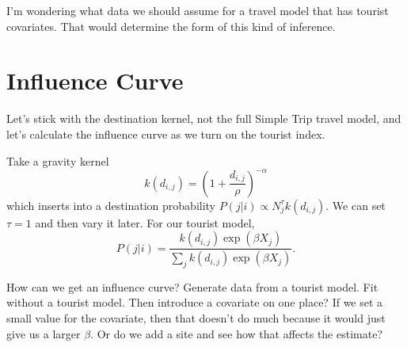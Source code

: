 \documentclass{article}
\begin{document}
I'm wondering what data we should assume for a travel model that has tourist covariates. That would determine the form of this kind of inference.

\section{Influence Curve}

Let's stick with the destination kernel, not the full Simple Trip travel model, and let's calculate the influence curve as we turn on the tourist index.

Take a gravity kernel
\begin{equation}
k(d_{i,j}) = \left(1+\frac{d_{i,j}}{\rho}\right)^{-\alpha}
\end{equation}
which inserts into a destination probability $P(j|i)\propto N_j^{\tau}k(d_{i,j})$. We can set $\tau=1$ and then vary it later. For our tourist model,
\begin{equation}
  P(j|i) = \frac{k(d_{i,j})\exp(\beta X_j)}{\sum_{j} k(d_{i,j})\exp(\beta X_j)}.
\end{equation}

How can we get an influence curve? Generate data from a tourist model. Fit without a tourist model. Then introduce a covariate on one place? If we set a small value for the covariate, then that doesn't do much because it would just give us a larger $\beta$. Or do we add a site and see how that affects the estimate?



\end{document}
